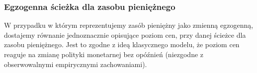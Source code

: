 




\subsubsection{Egzogenna ścieżka dla zasobu pieniężnego}


W przypadku w którym reprezentujemy zasób pieniężny jako zmienną egzogenną, dostajemy równanie jednoznacznie opisujące poziom cen, przy danej ścieżce dla zasobu pieniężnego. Jest to zgodne z ideą klasycznego modelu, że poziom cen reaguje na zmianę polityki monetarnej bez opóźnień (niezgodne z obserwowalnymi empirycznymi zachowaniami).

